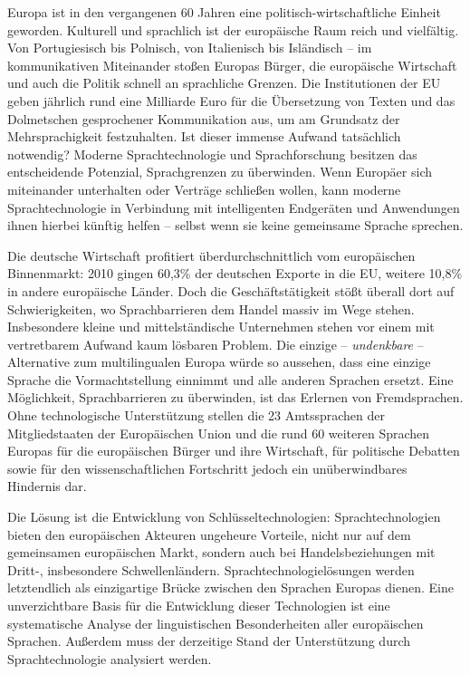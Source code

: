 \documentclass[]{../../metanetpaper}
\begin{document}
\begin{multicols}{2}
  Europa ist in den vergangenen 60 Jahren eine po\-li\-tisch-wirt\-schaft\-liche Einheit geworden. Kulturell und sprachlich ist der europäische Raum reich und vielfältig. Von Portugiesisch bis Polnisch, von Italienisch bis Isländisch -- im kommunikativen Miteinander stoßen Europas Bürger, die europäische Wirtschaft und auch die Politik schnell an sprachliche Grenzen. Die Institutionen der EU geben jährlich rund eine Milliarde Euro für die Übersetzung von Texten und das Dolmetschen gesprochener Kommunikation aus, um am Grundsatz der Mehrsprachigkeit festzuhalten. Ist dieser immense Aufwand tatsächlich notwendig? Moderne Sprachtechnologie und Sprachforschung besitzen das entscheidende Potenzial, Sprachgrenzen zu überwinden. Wenn Europäer sich miteinander unterhalten oder Verträge schließen wollen, kann moderne Sprachtechnologie in Verbindung mit intelligenten Endgeräten und Anwendungen ihnen hierbei künftig helfen -- selbst wenn sie keine gemeinsame Sprache sprechen.


Die deutsche Wirtschaft profitiert überdurchschnittlich vom europäischen Binnenmarkt: 2010 gingen 60,3\% der deutschen Exporte in die EU, weitere 10,8\% in andere europäische Länder. Doch die Geschäftstätigkeit stößt überall dort auf Schwierigkeiten, wo Sprachbarrieren dem Handel massiv im Wege stehen. Insbesondere kleine und mittelständische Unternehmen stehen vor einem mit vertretbarem Aufwand kaum lösbaren Problem. Die einzige -- \emph{undenkbare} -- Alternative zum multilingualen Europa würde so aussehen, dass eine einzige Sprache die Vormachtstellung einnimmt und alle anderen Sprachen ersetzt. Eine Möglichkeit, Sprachbarrieren zu überwinden, ist das Erlernen von Fremdsprachen. Ohne technologische Unterstützung stellen die 23 Amts\-sprachen der Mitgliedstaaten der Europäischen Union und die rund 60 weiteren Sprachen Europas für die europäischen Bürger und ihre Wirtschaft, für politische Debatten sowie für den wissenschaftlichen Fortschritt jedoch ein unüberwindbares Hindernis dar.

Die Lösung ist die Entwicklung von Schlüsseltechnologien: Sprachtechnologien bieten den europäischen Akteuren ungeheure Vorteile, nicht nur auf dem gemeinsamen europäischen Markt, sondern auch bei Handelsbeziehungen mit Dritt-, insbesondere Schwellenländern. Sprachtechnologielösungen werden letztendlich als einzigartige Brücke zwischen den Sprachen Europas dienen. Eine unverzichtbare Basis für die Entwicklung dieser Technologien ist eine systematische Analyse der linguistischen Besonderheiten aller europäischen Sprachen. Außerdem muss der derzeitige Stand der Unterstützung durch Sprachtechnologie analysiert werden. 


\end{multicols}
\end{document}
